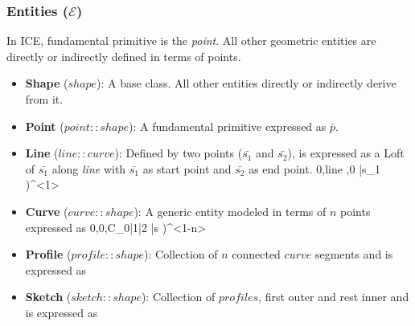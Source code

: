 \subsubsection{Entities ($\mathcal{E}$)}
In ICE, fundamental primitive is the {\em point}. All other geometric  entities are directly or indirectly defined in terms of points. 
\begin{itemize}[noitemsep,topsep=2pt,parsep=2pt,partopsep=2pt,label={},leftmargin=*]

\item {\bf Shape} ($shape$): A base class. All other entities directly or indirectly derive from it.

\item {\bf Point} ($point::shape$): A fundamental primitive expressed as $\bar{p}$. 	

\item {\bf Line} ($line::curve$): Defined by two points ($\bar{s_1}$ and $\bar{s_2}$), is expressed as a Loft of $\bar{s_1}$ along {\em line} with $\bar{s_1}$ as start point and $\bar{s_2}$ as end point.  {0,line ,0} {\bar{s_1} )^{<1>} }	

%

\item {\bf Curve} ($curve::shape$): A generic entity modeled in terms of $n$ points expressed as  {0,0,C_{0|1|2}} {\bar{s} )^{<1-n>}} 

%

\item {\bf Profile} ($profile::shape$): Collection of $n$ connected $curve$ segments and  is expressed as  

\item {\bf Sketch} ($sketch::shape$): Collection of $profiles$, first outer and rest  inner  and is expressed as 		
%


\end{itemize}
